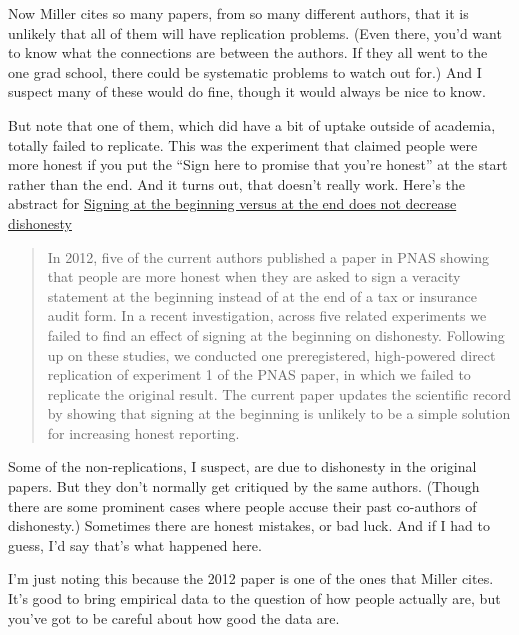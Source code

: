 \documentclass[
]{article}
\begin{document}
Now Miller cites so many papers, from so many different authors, that it
is unlikely that all of them will have replication problems. (Even
there, you'd want to know what the connections are between the authors.
If they all went to the one grad school, there could be systematic
problems to watch out for.) And I suspect many of these would do fine,
though it would always be nice to know.

But note that one of them, which did have a bit of uptake outside of
academia, totally failed to replicate. This was the experiment that
claimed people were more honest if you put the ``Sign here to promise
that you're honest'' at the start rather than the end. And it turns out,
that doesn't really work. Here's the abstract for
\href{https://www.pnas.org/content/117/13/7103}{Signing at the beginning
versus at the end does not decrease dishonesty}

\begin{quote}
In 2012, five of the current authors published a paper in PNAS showing
that people are more honest when they are asked to sign a veracity
statement at the beginning instead of at the end of a tax or insurance
audit form. In a recent investigation, across five related experiments
we failed to find an effect of signing at the beginning on dishonesty.
Following up on these studies, we conducted one preregistered,
high-powered direct replication of experiment 1 of the PNAS paper, in
which we failed to replicate the original result. The current paper
updates the scientific record by showing that signing at the beginning
is unlikely to be a simple solution for increasing honest reporting.
\end{quote}

Some of the non-replications, I suspect, are due to dishonesty in the
original papers. But they don't normally get critiqued by the same
authors. (Though there are some prominent cases where people accuse
their past co-authors of dishonesty.) Sometimes there are honest
mistakes, or bad luck. And if I had to guess, I'd say that's what
happened here.

I'm just noting this because the 2012 paper is one of the ones that
Miller cites. It's good to bring empirical data to the question of how
people actually are, but you've got to be careful about how good the
data are.
\end{document}
